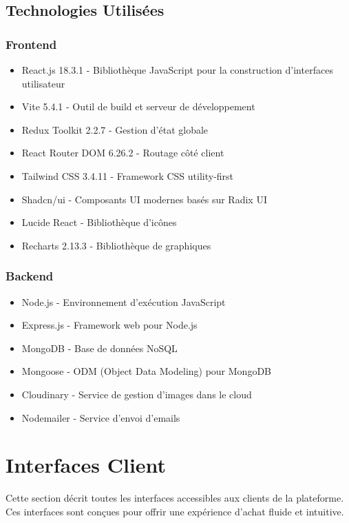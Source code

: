 \documentclass[12pt,a4paper]{article}
\begin{document}
\subsection{Technologies Utilisées}

\subsubsection{Frontend}
\begin{itemize}
    \item React.js 18.3.1 - Bibliothèque JavaScript pour la construction d'interfaces utilisateur
    \item Vite 5.4.1 - Outil de build et serveur de développement
    \item Redux Toolkit 2.2.7 - Gestion d'état globale
    \item React Router DOM 6.26.2 - Routage côté client
    \item Tailwind CSS 3.4.11 - Framework CSS utility-first
    \item Shadcn/ui - Composants UI modernes basés sur Radix UI
    \item Lucide React - Bibliothèque d'icônes
    \item Recharts 2.13.3 - Bibliothèque de graphiques
\end{itemize}

\subsubsection{Backend}
\begin{itemize}
    \item Node.js - Environnement d'exécution JavaScript
    \item Express.js - Framework web pour Node.js
    \item MongoDB - Base de données NoSQL
    \item Mongoose - ODM (Object Data Modeling) pour MongoDB
    \item Cloudinary - Service de gestion d'images dans le cloud
    \item Nodemailer - Service d'envoi d'emails
\end{itemize}

\newpage

\section{Interfaces Client}

Cette section décrit toutes les interfaces accessibles aux clients de la plateforme. Ces interfaces sont conçues pour offrir une expérience d'achat fluide et intuitive.
\end{document}
